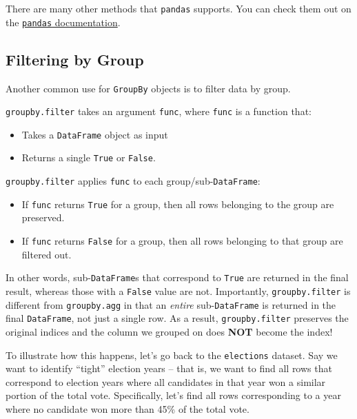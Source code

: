 \documentclass[
  letterpaper,
  DIV=11,
  numbers=noendperiod]{scrreprt}
\providecommand{\tightlist}{%
  \setlength{\itemsep}{0pt}\setlength{\parskip}{0pt}}\usepackage{longtable,booktabs,array}
\begin{document}
There are many other methods that \texttt{pandas} supports. You can
check them out on the
\href{https://pandas.pydata.org/docs/reference/groupby.html}{\texttt{pandas}
documentation}.

\subsection{Filtering by Group}\label{filtering-by-group}

Another common use for \texttt{GroupBy} objects is to filter data by
group.

\texttt{groupby.filter} takes an argument \texttt{func}, where
\texttt{func} is a function that:

\begin{itemize}
\tightlist
\item
  Takes a \texttt{DataFrame} object as input
\item
  Returns a single \texttt{True} or \texttt{False}.
\end{itemize}

\texttt{groupby.filter} applies \texttt{func} to each
group/sub-\texttt{DataFrame}:

\begin{itemize}
\tightlist
\item
  If \texttt{func} returns \texttt{True} for a group, then all rows
  belonging to the group are preserved.
\item
  If \texttt{func} returns \texttt{False} for a group, then all rows
  belonging to that group are filtered out.
\end{itemize}

In other words, sub-\texttt{DataFrame}s that correspond to \texttt{True}
are returned in the final result, whereas those with a \texttt{False}
value are not. Importantly, \texttt{groupby.filter} is different from
\texttt{groupby.agg} in that an \emph{entire} sub-\texttt{DataFrame} is
returned in the final \texttt{DataFrame}, not just a single row. As a
result, \texttt{groupby.filter} preserves the original indices and the
column we grouped on does \textbf{NOT} become the index!

To illustrate how this happens, let's go back to the \texttt{elections}
dataset. Say we want to identify ``tight'' election years -- that is, we
want to find all rows that correspond to election years where all
candidates in that year won a similar portion of the total vote.
Specifically, let's find all rows corresponding to a year where no
candidate won more than 45\% of the total vote.
\end{document}
